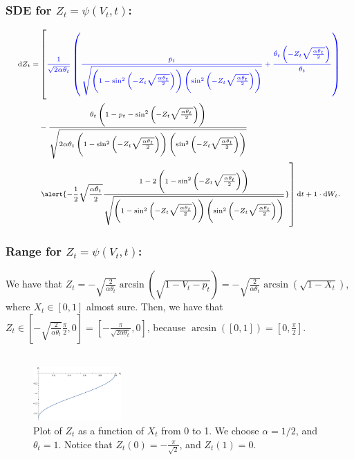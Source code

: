 \documentclass[aspectratio=169]{beamer}\usepackage[utf8]{inputenc}
\begin{document}
\begin{frame}\frametitle{SDE for $Z_t=\psi(V_t,t)$:}

\begin{equation*}
{\scriptsize
\begin{split}
\dif Z_t=&\left[{\color{blue}\frac{1}{\sqrt{2\alpha\theta_t}}\left(\frac{\dot{p}_t}{\sqrt{\left(1-\sin^2\left(-Z_t\sqrt{\frac{\alpha\theta_t}{2}}\right)\right)\left(\sin^2\left(-Z_t\sqrt{\frac{\alpha\theta_t}{2}}\right)\right)}}+\frac{\dot{\theta}_t\left(-Z_t\sqrt{\frac{\alpha\theta_t}{2}}\right)}{\theta_t}\right)}\right.\\
&-\frac{\theta_t\left(1-p_t-\sin^2\left(-Z_t\sqrt{\frac{\alpha\theta_t}{2}}\right)\right)}{\sqrt{2\alpha\theta_t\left(1-\sin^2\left(-Z_t\sqrt{\frac{\alpha\theta_t}{2}}\right)\right)\left(\sin^2\left(-Z_t\sqrt{\frac{\alpha\theta_t}{2}}\right)\right)}}\\
&\left.\alert{-\frac{1}{2}\sqrt{\frac{\alpha\theta_t}{2}}\frac{1-2\left(1-\sin^2\left(-Z_t\sqrt{\frac{\alpha\theta_t}{2}}\right)\right)}{\sqrt{\left(1-\sin^2\left(-Z_t\sqrt{\frac{\alpha\theta_t}{2}}\right)\right)\left(\sin^2\left(-Z_t\sqrt{\frac{\alpha\theta_t}{2}}\right)\right)}}}\right]\dif t+1\cdot \dif W_t.
\end{split}}
\end{equation*}

\end{frame}


\begin{frame}\frametitle{Range for $Z_t=\psi(V_t,t)$:}

We have that $Z_t=-\sqrt{\frac{2}{\alpha\theta_t}}\arcsin\left(\sqrt{1-V_t-p_t}\right)=-\sqrt{\frac{2}{\alpha\theta_t}}\arcsin\left(\sqrt{1-X_t}\right)$, where $X_t\in[0,1]$ almost sure. Then, we have that $Z_t\in\left[-\sqrt{\frac{2}{\alpha\theta_t}}\frac{\pi}{2},0\right]=\left[-\frac{\pi}{\sqrt{2\alpha\theta_t}},0\right]$, because $\arcsin\left([0,1]\right)=\left[0,\frac{\pi}{2}\right]$.\\
\quad\\
\graphicspath{{../../Mathematica_Files/}}
\begin{figure}[ht!]
\centering
\includegraphics[width=0.3\textwidth]{Range_Z.pdf}
\caption{Plot of $Z_t$ as a function of $X_t$ from 0 to 1. We choose $\alpha=1/2$, and $\theta_t=1$. Notice that $Z_t(0)=-\frac{\pi}{\sqrt{2}}$, and $Z_t(1)=0$.}
\end{figure}

\end{frame}
\end{document}
